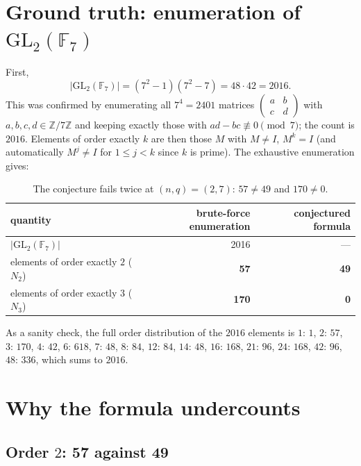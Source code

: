 \documentclass[11pt]{article}
\begin{document}
\section{Ground truth: enumeration of $\mathrm{GL}_2(\mathbb{F}_7)$}

First,
\[
\bigl|\mathrm{GL}_2(\mathbb{F}_7)\bigr| = (7^2-1)(7^2-7) = 48 \cdot 42 = 2016.
\]
This was confirmed by enumerating all $7^4 = 2401$ matrices
$\left(\begin{smallmatrix} a & b \\ c & d\end{smallmatrix}\right)$ with
$a,b,c,d \in \mathbb{Z}/7\mathbb{Z}$ and keeping exactly those with
$ad - bc \not\equiv 0 \pmod 7$; the count is $2016$. Elements of order exactly
$k$ are then those $M$ with $M \ne I$, $M^k = I$ (and automatically $M^j \ne I$
for $1 \le j < k$ since $k$ is prime). The exhaustive enumeration gives:

\begin{table}[h]
\centering
\begin{tabular}{lrr}
\toprule
quantity & brute-force enumeration & conjectured formula \\
\midrule
$|\mathrm{GL}_2(\mathbb{F}_7)|$                 & 2016 & --- \\
elements of order exactly $2$ ($N_2$)           & \textbf{57}  & \textbf{49} \\
elements of order exactly $3$ ($N_3$)           & \textbf{170} & \textbf{0} \\
\bottomrule
\end{tabular}
\caption{The conjecture fails twice at $(n,q) = (2,7)$: $57 \ne 49$ and $170 \ne 0$.}
\end{table}

As a sanity check, the full order distribution of the $2016$ elements is
$1{:}\,1$, $2{:}\,57$, $3{:}\,170$, $4{:}\,42$, $6{:}\,618$, $7{:}\,48$,
$8{:}\,84$, $12{:}\,84$, $14{:}\,48$, $16{:}\,168$, $21{:}\,96$, $24{:}\,168$,
$42{:}\,96$, $48{:}\,336$, which sums to $2016$.

\section{Why the formula undercounts}

\subsection{Order $2$: $\mathbf{57}$ against $\mathbf{49}$}
\end{document}
